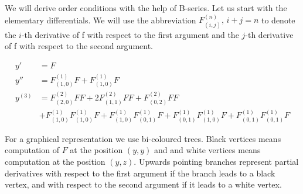 \documentclass[english,unicode]{article}
\begin{document}
We will derive order conditions with the help of B-series. Let us start with the elementary differentials.
We will use the abbreviation $F^{(n)}_{(i,j)},\,i+j=n$ to denote the $i$-th derivative of f with respect to the first argument and the $j$-th derivative of f with respect to the second argument.

\begin{align*}
y' & = F\\
y'' & = F^{(1)}_{(1,0)}F+F^{(1)}_{(1,0)}F\\
y^{(3)}& = F^{(2)}_{(2,0)}FF+2F^{(2)}_{(1,1)}FF+F^{(2)}_{(0,2)}FF\\
& +F^{(1)}_{(1,0)}F^{(1)}_{(1,0)}F
+F^{(1)}_{(1,0)}F^{(1)}_{(0,1)}F
+F^{(1)}_{(0,1)}F^{(1)}_{(1,0)}F
+F^{(1)}_{(0,1)}F^{(1)}_{(0,1)}F
\end{align*}


\vspace{1cm}
For a graphical representation we use bi-coloured trees. Black vertices means computation of $F$ at the position
$(y,y)$ and and white vertices means computation at the position $(y,z)$. Upwards pointing branches represent
partial derivatives with respect to the first argument if the branch leads to a black vertex, and with respect to the second argument if it leads to a white vertex.
  
\end{document}
